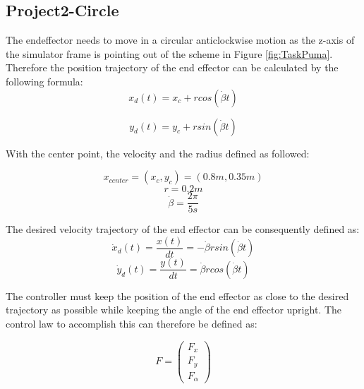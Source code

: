 \subsection{Project2-Circle }
The endeffector needs to move in a circular anticlockwise motion as the z-axis of the simulator frame is pointing out of the scheme in Figure \ref{fig:TaskPuma}. Therefore the position trajectory of the end effector can be calculated by the following formula:
\begin{equation}
 x_d(t) = x_c + r cos(\dot{\beta} t) 
\end{equation}

\begin{equation}
     y_d(t) = y_c + r sin( \dot{\beta} t)  
\end{equation}
\newline

With the center point, the velocity and the radius defined as followed:

\begin{equation}
    x_{center}=(x_c, y_c)=(0.8m, 0.35m) 
\end{equation}
\begin{equation}
    r=0.2m
\end{equation}
\begin{equation}
    \dot{\beta}=\frac{2\pi}{5s}
\end{equation}

The desired velocity trajectory of the end effector can be consequently defined as: \\
\begin{equation}
    \dot{x}_d(t) =\frac{x(t)}{dt}= -\dot{\beta} r sin( \dot{\beta} t) 
    \label{eq:xcv}
\end{equation}
\begin{equation}
    \dot{y}_d(t) =\frac{y(t)}{dt}=  \dot{\beta} r cos( \dot{\beta} t) 
    \label{eq:ycv}
\end{equation}
\newline


The controller must keep the position of the end effector as close to the desired trajectory as possible while keeping the angle of the end effector upright. The control law to accomplish this can therefore be defined as: 

\begin{equation}
    F=\begin{pmatrix} 
  F_x \\
  F_y\\
  F_\alpha\end{pmatrix}
\end{equation}

